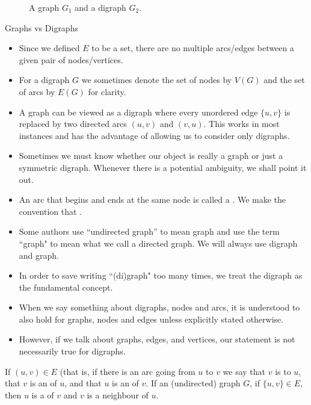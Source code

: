 \begin{figure}
\centerline{}
\caption{A graph $G_1$ and a digraph $G_2$.}
\label{fig:graphExample}
\end{figure}



\begin{note}
Graphs vs Digraphs

\begin{itemize}
\item Since we defined $E$ to be a set, there are no multiple arcs/edges
between a given pair of nodes/vertices.
\item For a digraph $G$ we sometimes denote the set of nodes by $V(G)$
and the set of arcs by $E(G)$ for clarity.

\item A graph can be viewed as a digraph where
every unordered edge $\{u,v\}$ is replaced by two directed arcs $(u,v)$
and $(v,u)$.  This  works in most instances and has the advantage of allowing us to consider only
digraphs.

\item Sometimes we must know whether our object is really a graph or just a symmetric digraph. Whenever there
is a potential ambiguity, we shall point it out.

\item  An arc that begins and ends at the same node is called a . We make the convention that
. 

\item  Some authors use ``undirected graph'' to mean graph and use the term ``graph" to mean what we call a directed graph. We will always use digraph and graph.
\item In order to save writing ``(di)graph" too many times, we treat the digraph as the fundamental concept.
\item When we say something about digraphs, nodes and arcs, it is understood to also hold for graphs, nodes and edges unless explicitly stated otherwise. 
\item However, if we talk
about graphs, edges, and vertices, our statement is not necessarily true
for digraphs. 


\end{itemize}
\end{note}


\begin{Definition}\label{def:adjacent}  
If $(u, v)\in E$ (that is, if there is an arc going from $u$ to $v$ we say that $v$ is  
to $u$, that $v$ is an  of $u$, and that $u$ is an 
 of $v$.
If an (undirected) graph $G$, if $\{u, v\} \in E$, then $u$ is a  of $v$ and $v$ is a neighbour of $u$. 
\end{Definition}

